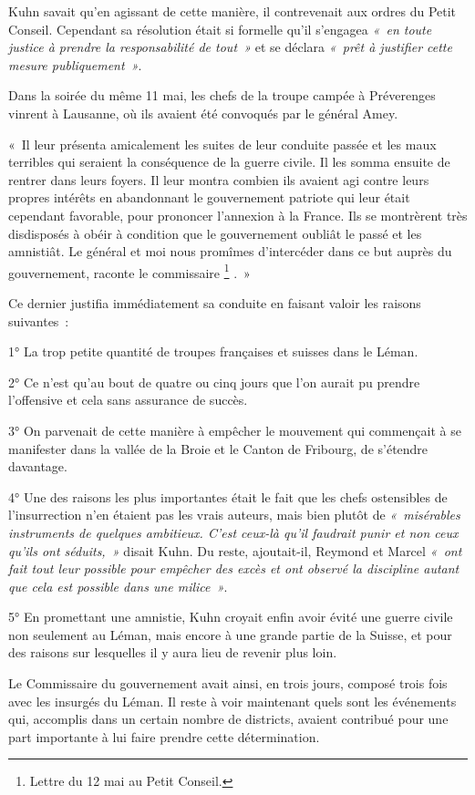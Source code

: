 \documentclass[french,twoside]{book} %
\newenvironment{quoteblock}%
  {\begin{quoting}}
  {\end{quoting}}
\newenvironment{quotebar}{%
    \def\FrameCommand{{\color{rubric!10!}\vrule width 0.5em} \hspace{0.9em}}%
    \def\OuterFrameSep{\itemsep} %
    \MakeFramed {\advance\hsize-\width \FrameRestore}
  }%
  {%
    \endMakeFramed
  }
\renewenvironment{quoteblock}%
  {%
    \savenotes
    \setstretch{0.9}
    \normalfont
    \begin{quotebar}
  }
  {%
    \end{quotebar}
    \spewnotes
  }
\begin{document}
\noindent Kuhn savait qu’en agissant de cette manière, il contrevenait aux ordres du Petit Conseil. Cependant sa résolution était si formelle qu’il s’engagea \emph{« en toute justice à prendre la responsabilité de tout »} et se déclara \emph{« prêt à justifier cette mesure publiquement »}.\par
Dans la soirée du même 11 mai, les chefs de la troupe campée à Préverenges vinrent à Lausanne, où ils avaient été convoqués par le général Amey.\par

\begin{quoteblock}
 \noindent « Il leur présenta amicalement les suites de leur conduite passée et les maux terribles qui seraient la conséquence de la guerre civile. Il les somma ensuite de rentrer dans leurs foyers. Il leur montra combien ils avaient agi contre leurs propres intérêts en abandonnant le gouvernement patriote qui leur était cependant favorable, pour prononcer l’annexion à la France. Ils se montrèrent très disdisposés à obéir à condition que le gouvernement oubliât le passé et les amnistiât. Le général et moi nous promîmes d’intercéder dans ce but auprès du gouvernement, raconte le commissaire \footnote{Lettre du 12 mai au Petit Conseil.} . »
 \end{quoteblock}

\noindent Ce dernier justifia immédiatement sa conduite en faisant valoir les raisons suivantes :\par
1° La trop petite quantité de troupes françaises et suisses dans le Léman.\par
2° Ce n’est qu’au bout de quatre ou cinq jours que l’on aurait pu prendre l’offensive et cela sans assurance de succès.\par
3° On parvenait de cette manière à empêcher le mouvement qui commençait à se manifester dans la vallée de la Broie et le Canton de Fribourg, de s’étendre davantage.\par
4° Une des raisons les plus importantes était le fait que les chefs ostensibles de l’insurrection n’en étaient pas les vrais auteurs, mais bien plutôt de \emph{« misérables instruments de quelques ambitieux. C’est ceux-là qu’il faudrait punir et non ceux qu’ils ont séduits, »} disait Kuhn. Du reste, ajoutait-il, Reymond et Marcel \emph{« ont fait tout leur possible pour empêcher des excès et ont observé la discipline autant que cela est possible dans une milice »}.\par
5° En promettant une amnistie, Kuhn croyait enfin avoir évité une guerre civile non seulement au Léman, mais encore à une grande partie de la Suisse, et pour des raisons sur lesquelles il y aura lieu de revenir plus loin.\par
Le Commissaire du gouvernement avait ainsi, en trois jours, composé trois fois avec les insurgés du Léman. Il reste à voir maintenant quels sont les événements qui, accomplis dans un certain nombre de districts, avaient contribué pour une part importante à lui faire prendre cette détermination.
\end{document}
